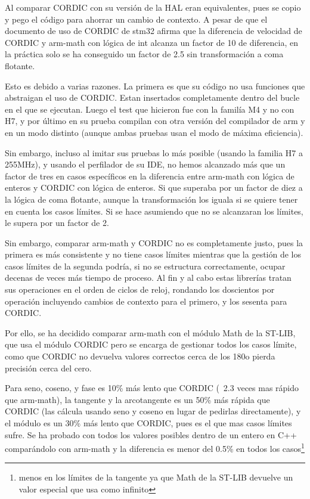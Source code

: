 \documentclass{report}
\begin{document}
Al comparar CORDIC con su versión de la HAL eran equivalentes, pues se copio y pego el código para ahorrar un cambio de contexto. A pesar de que el documento de uso de CORDIC de stm32\cite{web:stm32:CORDIC} afirma que la diferencia de velocidad de CORDIC y arm-math con lógica de int alcanza un factor de 10 de diferencia, en la práctica solo se ha conseguido un factor de 2.5 sin transformación a coma flotante.  
\par
Esto es debido a varias razones. La primera es que su código no usa funciones que abstraigan el uso de CORDIC. Estan insertados completamente dentro del bucle en el que se ejecutan. Luego el test que hicieron fue con la familía M4 y no con H7, y por último en su prueba compilan con otra versión del compilador de arm y en un modo distinto (aunque ambas pruebas usan el modo de máxima eficiencia). \par
Sin embargo, incluso al imitar sus pruebas lo más posible (usando la familia H7 a 255MHz), y usando el perfilador de su IDE, no hemos alcanzado más que un factor de tres en casos específicos en la diferencia entre arm-math con lógica de enteros y CORDIC con lógica de enteros. Si que superaba por un factor de diez a la lógica de coma flotante, aunque la transformación los iguala si se quiere tener en cuenta los casos límites. Si se hace asumiendo que no se alcanzaran los límites, le supera por un factor de 2.
\par \vspace{0.3cm}
Sin embargo, comparar arm-math y CORDIC no es completamente justo, pues la primera es más consistente y no tiene casos límites mientras que la gestión de los casos límites de la segunda podría, si no se estructura correctamente, ocupar decenas de veces más tiempo de proceso. Al fin y al cabo estas librerías tratan sus operaciones en el orden de ciclos de reloj, rondando los doscientos por operación incluyendo cambios de contexto para el primero, y los sesenta para CORDIC. 
\par 
Por ello, se ha decidido comparar arm-math con el módulo Math de la ST-LIB, que usa el módulo CORDIC pero se encarga de gestionar todos los casos límite, como que CORDIC no devuelva valores correctos cerca de los 180\textdegree o pierda precisión cerca del cero. 
\par
Para seno, coseno, y fase es 10\% más lento que CORDIC (~2.3 veces mas rápido que arm-math), la tangente y la arcotangente es un 50\% más rápida que CORDIC (las cálcula usando seno y coseno en lugar de pedirlas directamente), y el módulo es un 30\% más lento que CORDIC, pues es el que mas casos límites sufre. Se ha probado con todos los valores posibles dentro de un entero en C++ comparándolo con arm-math y la diferencia es menor del 0.5\% en todos los casos\footnote{menos en los límites de la tangente ya que Math de la ST-LIB devuelve un valor especial que usa como infinito}
\end{document}
